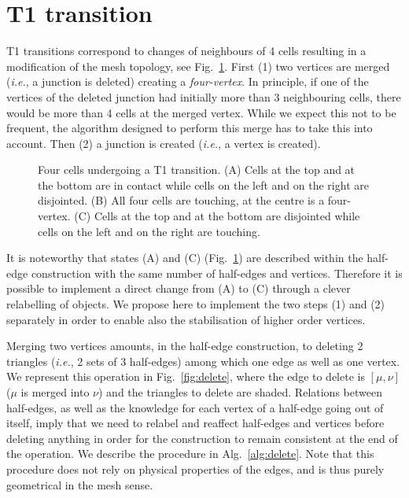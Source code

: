 \documentclass[aps, superscriptaddress, notitlepage, longbibliography]{revtex4-1}
\begin{document}
\section{T1 transition}

T1 transitions correspond to changes of neighbours of 4 cells resulting in a modification of the mesh topology, see Fig.~\ref{fig:t1}. First (1) two vertices are merged (\textit{i.e.}, a junction is deleted) creating a \textit{four-vertex}. In principle, if one of the vertices of the deleted junction had initially more than 3 neighbouring cells, there would be more than 4 cells at the merged vertex. While we expect this not to be frequent, the algorithm designed to perform this merge has to take this into account. Then (2) a junction is created (\textit{i.e.}, a vertex is created).

\begin{figure}[!b]
\centering
\begin{tikzpicture}[scale=0.25*\scale]

\end{tikzpicture}
\caption{Four cells undergoing a T1 transition. (A) Cells at the top and at the bottom are in contact while cells on the left and on the right are disjointed. (B) All four cells are touching, at the centre is a four-vertex. (C) Cells at the top and at the bottom are disjointed while cells on the left and on the right are touching.}
\label{fig:t1}
\end{figure}

It is noteworthy that states (A) and (C) (Fig.~\ref{fig:t1}) are described within the half-edge construction with the same number of half-edges and vertices. Therefore it is possible to implement a direct change from (A) to (C) through a clever relabelling of objects. We propose here to implement the two steps (1) and (2) separately in order to enable also the stabilisation of higher order vertices.

Merging two vertices amounts, in the half-edge construction, to deleting 2 triangles (\textit{i.e.}, 2 sets of 3 half-edges) among which one edge as well as one vertex. We represent this operation in Fig.~\ref{fig:delete}, where the edge to delete is $[\mu, \nu]$ ($\mu$ is merged into $\nu$) and the triangles to delete are shaded. Relations between half-edges, as well as the knowledge for each vertex of a half-edge going out of itself, imply that we need to relabel and reaffect half-edges and vertices before deleting anything in order for the construction to remain consistent at the end of the operation. We describe the procedure in Alg.~\ref{alg:delete}. Note that this procedure does not rely on physical properties of the edges, and is thus purely geometrical in the mesh sense.
\end{document}
